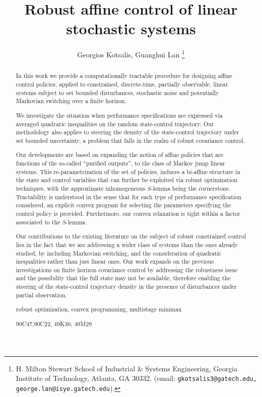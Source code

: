 \documentclass[letterpaper,11pt]{article}
\title{
	Robust affine control of linear stochastic systems}
\author{
	Georgios Kotsalis, Guanghui Lan
	\thanks{H. Milton Stewart School of Industrial \& Systems Engineering, Georgia Institute of Technology, Atlanta, GA 30332.
		(email: {\tt gkotsalis3@gatech.edu,   \tt george.lan@isye.gatech.edu}).}
}
\begin{document}
\maketitle

\begin{abstract}
In this work we provide a computationally tractable procedure for designing affine control policies, applied to  constrained, discrete-time, partially observable, linear systems subject to set bounded disturbances, stochastic noise and potentially Markovian switching over a finite horizon. 

We investigate the situation  when performance specifications are expressed 
via averaged quadratic inequalities on the random state-control trajectory. Our methodology also applies  to steering the density of the state-control trajectory under set bounded uncertainty, a problem that falls in the realm of robust covariance control.

Our developments are based on expanding the notion of affine policies that are functions of  
the so-called ``purified outputs'',  to the class of Markov jump linear systems. This re-parametrization of the set of policies, induces a bi-affine structure in the state and control variables that can further be  exploited via robust optimization techniques, with the approximate inhomogeneous $S$-lemma being the cornerstone. Tractability is understood in the sense that for each type of performance specification considered, an explicit convex program for selecting the parameters specifying the control policy is provided. Furthermore, our convex relaxation is tight within a factor associated to the $S$-lemma. 

Our contributions to the 
existing literature on the subject of robust constrained control lies in the fact that 
we are addressing a wider class of systems than the ones already studied, by including Markovian switching, and the consideration of quadratic inequalities rather than just linear ones. Our work expands on the previous investigations on finite horizon covariance control by addressing the robustness issue and the possibility that the full state may not be available,  therefore enabling the steering of the state-control trajectory density in the presence of disturbances under partial observation.

 \vspace{.1in}
 
  robust optimization, convex programming, 
 multistage minimax
 
 \vspace{.07in}
 
  90C47,90C22, 49K30,	49M29
 
\end{abstract}
\end{document}
